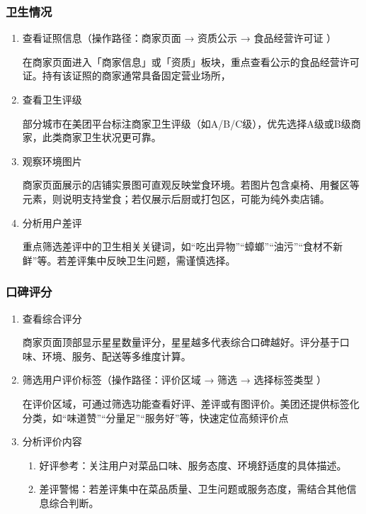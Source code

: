 \subsubsection{卫生情况}
\begin{enumerate}
  \item 查看证照信息（操作路径：商家页面 → 资质公示 → 食品经营许可证 ）

  在商家页面进入「商家信息」或「资质」板块，重点查看公示的食品经营许可证。持有该证照的商家通常具备固定营业场所，

  \item 查看卫生评级

  部分城市在美团平台标注商家卫生评级（如A/B/C级），优先选择A级或B级商家，此类商家卫生状况更可靠。

  \item 观察环境图片

  商家页面展示的店铺实景图可直观反映堂食环境。若图片包含桌椅、用餐区等元素，则说明支持堂食；若仅展示后厨或打包区，可能为纯外卖店铺。

  \item 分析用户差评

  重点筛选差评中的卫生相关关键词，如“吃出异物”“蟑螂”“油污”“食材不新鲜”等。若差评集中反映卫生问题，需谨慎选择。

\end{enumerate}
\subsubsection{口碑评分}
\begin{enumerate}
  \item 查看综合评分

  商家页面顶部显示星星数量评分，星星越多代表综合口碑越好。评分基于口味、环境、服务、配送等多维度计算。

  \item  筛选用户评价标签（操作路径：评价区域 → 筛选 → 选择标签类型 ）

  在评价区域，可通过筛选功能查看好评、差评或有图评价。美团还提供标签化分类，如“味道赞”“分量足”“服务好”等，快速定位高频评价点

 \item  分析评价内容

  \begin{enumerate}
    \item 好评参考：关注用户对菜品口味、服务态度、环境舒适度的具体描述。
    \item 差评警惕：若差评集中在菜品质量、卫生问题或服务态度，需结合其他信息综合判断。
  \end{enumerate}
\end{enumerate}
